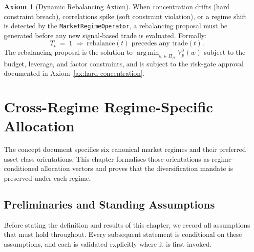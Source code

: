 \documentclass[12pt,openany]{book}
\newcommand{\bfw}{\mathbf{w}}
\DeclareMathOperator*{\argmin}{arg\,min}
\numberwithin{equation}{chapter}
\theoremstyle{plain}
\theoremstyle{definition}
\newtheorem{axiom}[theorem]{Axiom}
\theoremstyle{remark}
\def\bfw{w}%
\begin{document}
\begin{axiom}[Dynamic Rebalancing Axiom]
\label{ax:rebalancing}
When concentration drifts (hard constraint breach), correlations
spike (soft constraint violation), or a regime shift is detected
by the \texttt{MarketRegimeOperator}, a rebalancing proposal must
be generated before any new signal-based trade is evaluated.
Formally:
\begin{equation}
  T_t \;=\; 1
  \;\Longrightarrow\;
  \text{rebalance}(t) \text{ precedes any } \text{trade}(t).
  \label{eq:rebalance-priority}
\end{equation}
The rebalancing proposal is the solution to
$\argmin_{\bfw \in \Pi_H} V_p^\lambda(\bfw)$ subject to the
budget, leverage, and factor constraints, and is subject to the
risk-gate approval documented in Axiom~\ref{ax:hard-concentration}.
\end{axiom}

\chapter{Cross-Regime Regime-Specific Allocation}
\label{ch:regime-alloc}

The concept document specifies six canonical market regimes and their
preferred asset-class orientations.  This chapter formalises those
orientations as regime-conditioned allocation vectors and proves
that the diversification mandate is preserved under each regime.

\section{Preliminaries and Standing Assumptions}
\label{sec:regime-alloc-prelim}

Before stating the definition and results of this chapter, we
record all assumptions that must hold throughout.  Every
subsequent statement is conditional on these assumptions, and
each is validated explicitly where it is first invoked.
\end{document}
